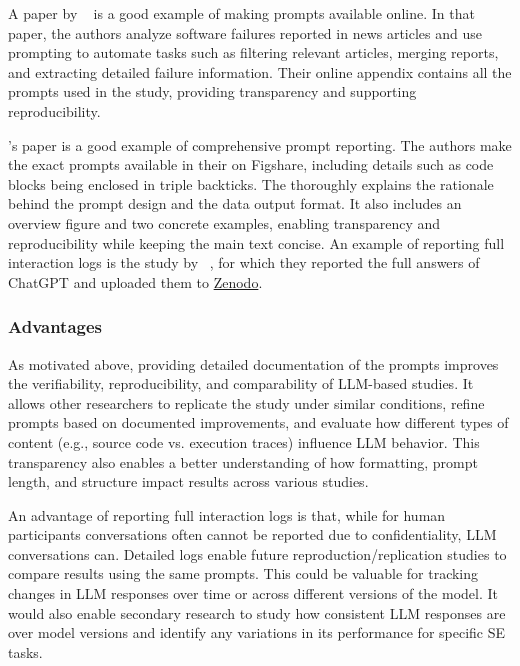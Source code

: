 A paper by \citeauthor{anandayuvaraj2024fail}~\cite{anandayuvaraj2024fail} is a good example of making prompts available online.
In that paper, the authors analyze software failures reported in news articles and use prompting to automate tasks such as filtering relevant articles, merging reports, and extracting detailed failure information.
Their online appendix contains all the prompts used in the study, providing transparency and supporting reproducibility.

\citeauthor{Liang2024}'s paper is a good example of comprehensive prompt reporting.
The authors make the exact prompts available in their \supplementarymaterial on Figshare, including details such as code blocks being enclosed in triple backticks.
The \paper thoroughly explains the rationale behind the prompt design and the data output format.
It also includes an overview figure and two concrete examples, enabling transparency and reproducibility while keeping the main text concise.
An example of reporting full interaction logs is the study by \citeauthor{ronanki2023investigating}~\cite{ronanki2023investigating}, for which they reported the full answers of ChatGPT and uploaded them to \href{https://zenodo.org/records/8124936}{Zenodo}. 

\subsubsection{Advantages}

As motivated above, providing detailed documentation of the prompts improves the verifiability, reproducibility, and comparability of LLM-based studies.
It allows other researchers to replicate the study under similar conditions, refine prompts based on documented improvements, and evaluate how different types of content (e.g., source code vs. execution traces) influence LLM behavior.
This transparency also enables a better understanding of how formatting, prompt length, and structure impact results across various studies.

An advantage of reporting full interaction logs is that, while for human participants conversations often cannot be reported due to confidentiality, LLM conversations can.
Detailed logs enable future reproduction/replication studies to compare results using the same prompts.
This could be valuable for tracking changes in LLM responses over time or across different versions of the model.
It would also enable secondary research to study how consistent LLM responses are over model versions and identify any variations in its performance for specific SE tasks.

